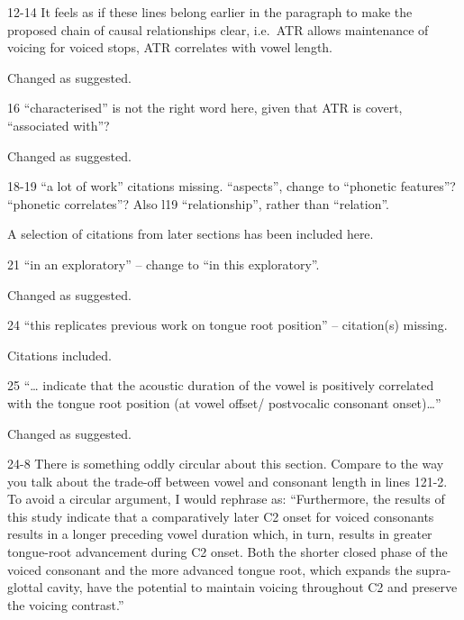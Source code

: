 \documentclass[]{article}
\begin{document}
12-14 It feels as if these lines belong earlier in the paragraph to make
the proposed chain of causal relationships clear, i.e.~ATR allows
maintenance of voicing for voiced stops, ATR correlates with vowel
length.

\color{plum}

Changed as suggested. \color{black}

16 ``characterised'' is not the right word here, given that ATR is
covert, ``associated with''?

\color{plum}

Changed as suggested. \color{black}

18-19 ``a lot of work'' citations missing. ``aspects'', change to
``phonetic features''? ``phonetic correlates''? Also l19
``relationship'', rather than ``relation''.

\color{plum}

A selection of citations from later sections has been included here.
\color{black}

21 ``in an exploratory'' -- change to ``in this exploratory''.

\color{plum}

Changed as suggested. \color{black}

24 ``this replicates previous work on tongue root position'' --
citation(s) missing.

\color{plum}

Citations included. \color{black}

25 ``\ldots{} indicate that the acoustic duration of the vowel is
positively correlated with the tongue root position (at vowel offset/
postvocalic consonant onset)\ldots{}''

\color{plum}

Changed as suggested. \color{black}

24-8 There is something oddly circular about this section. Compare to
the way you talk about the trade-off between vowel and consonant length
in lines 121-2. To avoid a circular argument, I would rephrase as:
``Furthermore, the results of this study indicate that a comparatively
later C2 onset for voiced consonants results in a longer preceding vowel
duration which, in turn, results in greater tongue-root advancement
during C2 onset. Both the shorter closed phase of the voiced consonant
and the more advanced tongue root, which expands the supra-glottal
cavity, have the potential to maintain voicing throughout C2 and
preserve the voicing contrast.''

\color{plum}
\end{document}
